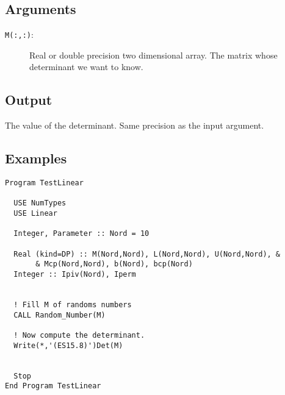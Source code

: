 \subsection{Arguments}

\begin{description}
\item[\texttt{M(:,:)}: ] Real or double precision two dimensional
  array. The matrix whose determinant we want to know.
\end{description}

\subsection{Output}

The value of the determinant. Same precision as the input argument.

\subsection{Examples}

\begin{verbatim}
Program TestLinear

  USE NumTypes
  USE Linear

  Integer, Parameter :: Nord = 10

  Real (kind=DP) :: M(Nord,Nord), L(Nord,Nord), U(Nord,Nord), &
       & Mcp(Nord,Nord), b(Nord), bcp(Nord)
  Integer :: Ipiv(Nord), Iperm


  ! Fill M of randoms numbers
  CALL Random_Number(M)

  ! Now compute the determinant.
  Write(*,'(ES15.8)')Det(M)


  Stop
End Program TestLinear
\end{verbatim}

